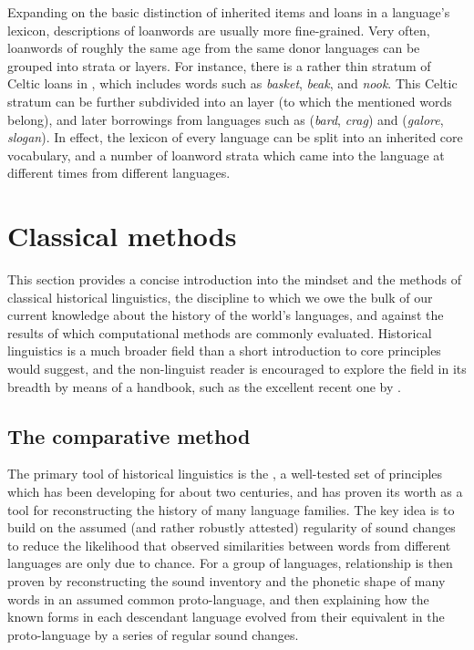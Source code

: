 Expanding on the basic distinction of inherited items and loans in a language's lexicon, descriptions of loanwords are usually more fine-grained. Very often, loanwords of roughly the same age from the same donor languages can be grouped into strata or layers. For instance, there is a rather thin stratum of Celtic loans in , which includes words such as \textit{basket}, \textit{beak}, and \textit{nook}. This Celtic stratum can be further subdivided into an  layer (to which the mentioned words belong), and later borrowings from languages such as  (\textit{bard}, \textit{crag}) and  (\textit{galore}, \textit{slogan}). In effect, the lexicon of every language can be split into an inherited core vocabulary, and a number of loanword strata which came into the language at different times from different languages.

\section{Classical methods}
This section provides a concise introduction into the mindset and the methods of classical historical linguistics, the discipline to which we owe the bulk of our current knowledge about the history of the world's languages, and against the results of which computational methods are commonly evaluated. Historical linguistics is a much broader field than a short introduction to core principles would suggest, and the non-linguist reader is encouraged to explore the field in its breadth by means of a handbook, such as the excellent recent one by \citet{bowern_evans_2015}.

\subsection{The comparative method}
The primary tool of historical linguistics is the \textit{}, a well-tested set of principles which has been developing for about two centuries, and has proven its worth as a tool for reconstructing the history of many language families. The key idea is to build on the assumed (and rather robustly attested) regularity of sound changes to reduce the likelihood that observed similarities between words from different languages are only due to chance. For a group of languages, relationship is then proven by reconstructing the sound inventory and the phonetic shape of many words in an assumed common proto-language, and then explaining how the known forms in each descendant language evolved from their equivalent in the proto-language by a series of regular sound changes.

